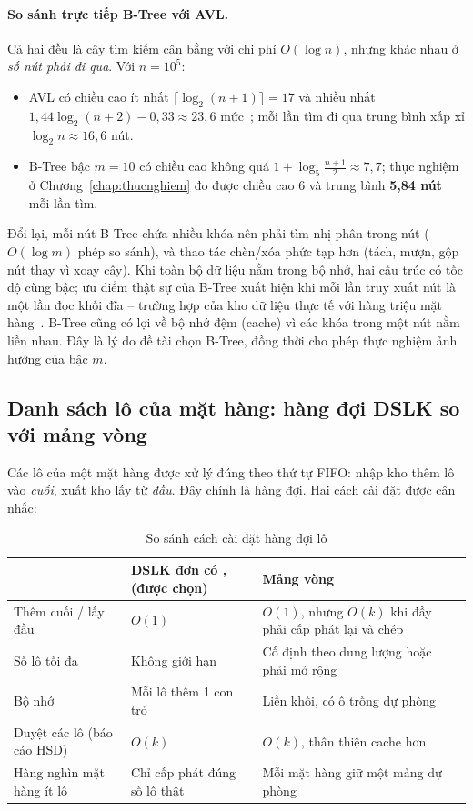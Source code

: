 \paragraph{So sánh trực tiếp B-Tree với AVL.} Cả hai đều là cây tìm kiếm cân bằng với chi phí $O(\log n)$,
nhưng khác nhau ở \emph{số nút phải đi qua}. Với $n = 10^5$:
\begin{itemize}
  \item AVL có chiều cao ít nhất $\lceil\log_2(n+1)\rceil = 17$ và nhiều nhất
        $1{,}44\log_2(n+2) - 0{,}33 \approx 23{,}6$ mức~\cite{avl,knuth}; mỗi lần tìm đi qua trung bình xấp xỉ
        $\log_2 n \approx 16{,}6$ nút.
  \item B-Tree bậc $m = 10$ có chiều cao không quá $1 + \log_5\frac{n+1}{2} \approx 7{,}7$; thực nghiệm ở
        Chương~\ref{chap:thucnghiem} đo được chiều cao 6 và trung bình \textbf{5,84 nút} mỗi lần tìm.
\end{itemize}
Đổi lại, mỗi nút B-Tree chứa nhiều khóa nên phải tìm nhị phân trong nút ($O(\log m)$ phép so sánh), và
thao tác chèn/xóa phức tạp hơn (tách, mượn, gộp nút thay vì xoay cây). Khi toàn bộ dữ liệu nằm trong bộ nhớ,
hai cấu trúc có tốc độ cùng bậc; ưu điểm thật sự của B-Tree xuất hiện khi mỗi lần truy xuất nút là một lần đọc
khối đĩa -- trường hợp của kho dữ liệu thực tế với hàng triệu mặt hàng~\cite{bayer,comer}. B-Tree cũng có lợi
về bộ nhớ đệm (cache) vì các khóa trong một nút nằm liền nhau. Đây là lý do đề tài chọn B-Tree, đồng thời
cho phép thực nghiệm ảnh hưởng của bậc $m$.

\subsection{Danh sách lô của mặt hàng: hàng đợi DSLK so với mảng vòng}

Các lô của một mặt hàng được xử lý đúng theo thứ tự FIFO: nhập kho thêm lô vào \emph{cuối}, xuất kho lấy từ
\emph{đầu}. Đây chính là hàng đợi. Hai cách cài đặt được cân nhắc:

\begin{table}[htbp]
\centering\small
\caption{So sánh cách cài đặt hàng đợi lô}
\label{tab:sosanhhangdoi}
\begin{tabularx}{\linewidth}{@{}l Y Y@{}}
\toprule
& \textbf{DSLK đơn có , } (được chọn) & \textbf{Mảng vòng} \\
\midrule
Thêm cuối / lấy đầu & $O(1)$ & $O(1)$, nhưng $O(k)$ khi đầy phải cấp phát lại và chép \\
Số lô tối đa & Không giới hạn & Cố định theo dung lượng hoặc phải mở rộng \\
Bộ nhớ & Mỗi lô thêm 1 con trỏ  & Liền khối, có ô trống dự phòng \\
Duyệt các lô (báo cáo HSD) & $O(k)$ & $O(k)$, thân thiện cache hơn \\
Hàng nghìn mặt hàng ít lô & Chỉ cấp phát đúng số lô thật & Mỗi mặt hàng giữ một mảng dự phòng \\
\bottomrule
\end{tabularx}
\end{table}

